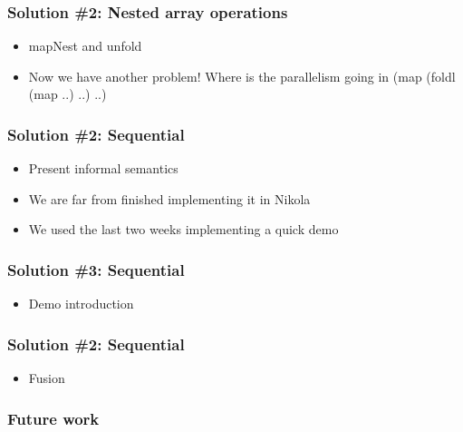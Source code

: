 \documentclass{beamer}
\begin{document}

\begin{frame}
  \frametitle{Solution \#2: Nested array operations}
  \begin{itemize}
  \item mapNest and unfold
  \item Now we have another problem! Where is the parallelism going in (map (foldl (map ..) ..) ..)
  \end{itemize}
\end{frame}

\begin{frame}
  \frametitle{Solution \#2: Sequential}
  \begin{itemize}
  \item Present informal semantics
  \item We are far from finished implementing it in Nikola
  \item We used the last two weeks implementing a quick demo
  \end{itemize}
\end{frame}

\begin{frame}
  \frametitle{Solution \#3: Sequential}
  \begin{itemize}
  \item Demo introduction
  \end{itemize}
\end{frame}

\begin{frame}
  \frametitle{Solution \#2: Sequential}
  \begin{itemize}
  \item Fusion
  \end{itemize}
\end{frame}

\begin{frame}
  \frametitle{Future work}
\end{frame}
\end{document}
